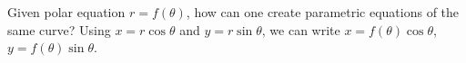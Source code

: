 {Given polar equation $r=f(\theta)$, how can one create parametric equations of the same curve?}
{Using $x=r\cos\theta$ and $y=r\sin\theta$, we can write $x=f(\theta)\cos\theta$, $y=f(\theta)\sin\theta$.
}
